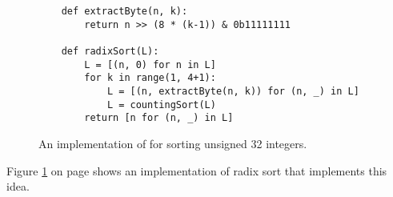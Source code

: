 \begin{figure}[!ht]
\centering
\begin{verbatim}
    def extractByte(n, k):
        return n >> (8 * (k-1)) & 0b11111111
    
    def radixSort(L):
        L = [(n, 0) for n in L]
        for k in range(1, 4+1):
            L = [(n, extractByte(n, k)) for (n, _) in L]
            L = countingSort(L)
        return [n for (n, _) in L]    
\end{verbatim}
\vspace*{-0.3cm}
\caption{An implementation of  for sorting unsigned 32 integers.}
\label{fig:radix-sort.stlx}
\end{figure}
Figure \ref{fig:radix-sort.stlx} on page \pageref{fig:radix-sort.stlx} shows an implementation of radix
sort that implements this idea.
